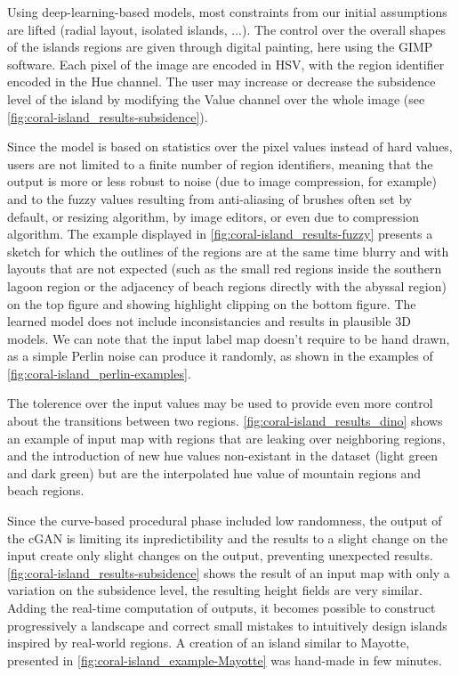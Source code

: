 Using deep-learning-based models, most constraints from our initial assumptions are lifted (radial layout, isolated islands, ...). The control over the overall shapes of the islands regions are given through digital painting, here using the GIMP software. Each pixel of the image are encoded in HSV, with the region identifier encoded in the Hue channel. The user may increase or decrease the subsidence level of the island by modifying the Value channel over the whole image (see \cref{fig:coral-island_results-subsidence}). 

Since the model is based on statistics over the pixel values instead of hard values, users are not limited to a finite number of region identifiers, meaning that the output is more or less robust to noise (due to image compression, for example) and to the fuzzy values resulting from anti-aliasing of brushes often set by default, or resizing algorithm, by image editors, or even due to compression algorithm. The example displayed in \cref{fig:coral-island_results-fuzzy} presents a sketch for which the outlines of the regions are at the same time blurry and with layouts that are not expected (such as the small red regions inside the southern lagoon region or the adjacency of beach regions directly with the abyssal region) on the top figure and showing highlight clipping on the bottom figure. The learned model does not include inconsistancies and results in plausible 3D models. We can note that the input label map doesn't require to be hand drawn, as a simple Perlin noise can produce it randomly, as shown in the examples of \cref{fig:coral-island_perlin-examples}.

The tolerence over the input values may be used to provide even more control about the transitions between two regions. \cref{fig:coral-island_results_dino} shows an example of input map with regions that are leaking over neighboring regions, and the introduction of new hue values non-existant in the dataset (light green and dark green) but are the interpolated hue value of mountain regions and beach regions.

Since the curve-based procedural phase included low randomness, the output of the cGAN is limiting its inpredictibility and the results to a slight change on the input create only slight changes on the output, preventing unexpected results. \cref{fig:coral-island_results-subsidence} shows the result of an input map with only a variation on the subsidence level, the resulting height fields are very similar. Adding the real-time computation of outputs, it becomes possible to construct progressively a landscape and correct small mistakes to intuitively design islands inspired by real-world regions. A creation of an island similar to Mayotte, presented in \cref{fig:coral-island_example-Mayotte} was hand-made in few minutes. 

